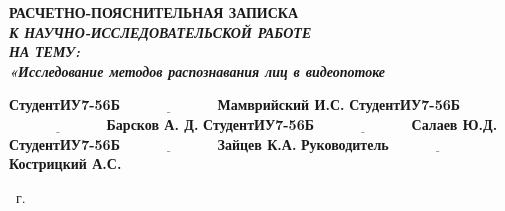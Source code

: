 \begin{titlepage}
	
	\begin{center}
		\Large\textbf{РАСЧЕТНО-ПОЯСНИТЕЛЬНАЯ ЗАПИСКА}\\
		\large\textit{\textbf{К НАУЧНО-ИССЛЕДОВАТЕЛЬСКОЙ РАБОТЕ}}\\
            \large\textbf{\textit{НА ТЕМУ:}}\\
            \textbf{\textit{«Исследование методов распознавания лиц в видеопотоке}}
	\end{center}\vspace{2cm}

	
	\noindent\textbf{Студент}\hspace{1cm}\textbf{ИУ7-56Б}\hfill$\underline{\text{~~~~~~~~~~~~~~~~~~~~~}}$\>\textbf{Мамврийский И.С.}\vspace{1em}\newline
    \noindent\textbf{Студент}\hspace{1cm}\textbf{ИУ7-56Б}\hspace{4.65cm}$\underline{\text{~~~~~~~~~~~~~~~~~~~~~}}$\>\textbf{Барсков А. Д.}\vspace{1em}\newline
    \noindent\textbf{Студент}\hspace{1cm}\textbf{ИУ7-56Б}\hspace{4.65cm}$\underline{\text{~~~~~~~~~~~~~~~~~~~~~}}$\>\textbf{Салаев Ю.Д.}\vspace{1em}\newline
    \noindent\textbf{Студент}\hspace{1cm}\textbf{ИУ7-56Б}\hspace{4.65cm}$\underline{\text{~~~~~~~~~~~~~~~~~~~~~}}$\>\textbf{Зайцев К.А.}\vspace{1em}\newline
    \noindent\textbf{Руководитель}\hspace{1cm}\hspace{5.25cm}$\underline{\text{~~~~~~~~~~~~~~~~~~~~~}}$\>\textbf{Кострицкий А.С.}\newline

	
	\begin{center}
		\vfill
		\the\year
		~г.
	\end{center}
\end{titlepage}